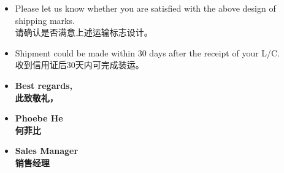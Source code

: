 \documentclass[12pt]{beamer}
\begin{document}
\begin{frame}
    \begin{itemize}
    \item Please let us know whether you are satisfied with the above design of shipping marks. \\
    请确认是否满意上述运输标志设计。
    
    \item Shipment could be made within 30 days after the receipt of your L/C. \\
    收到信用证后30天内可完成装运。
    
    \item \textbf{Best regards,} \\
    \textbf{此致敬礼，}
    
    \item \textbf{Phoebe He} \\
    \textbf{何菲比}
    
    \item \textbf{Sales Manager} \\
    \textbf{销售经理}
    \end{itemize}

    \end{frame}

\end{document}
